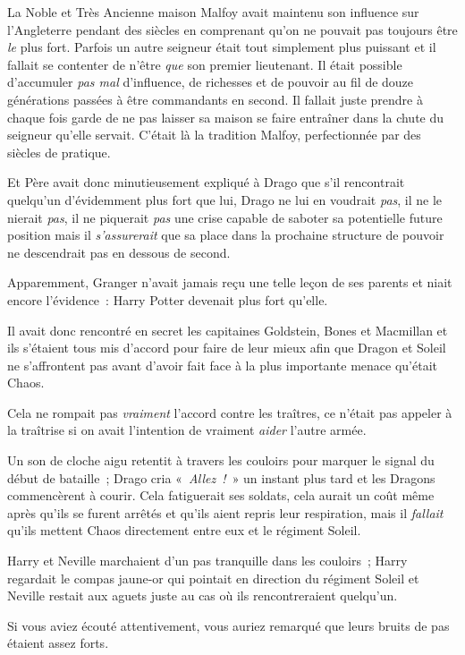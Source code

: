 La Noble et Très Ancienne maison Malfoy avait maintenu son influence sur l'Angleterre pendant des siècles en comprenant qu'on ne pouvait pas toujours être \emph{le} plus fort. Parfois un autre seigneur était tout simplement plus puissant et il fallait se contenter de n'être \emph{que} son premier lieutenant. Il était possible d'accumuler \emph{pas mal} d'influence, de richesses et de pouvoir au fil de douze générations passées à être commandants en second. Il fallait juste prendre à chaque fois garde de ne pas laisser sa maison se faire entraîner dans la chute du seigneur qu'elle servait. C'était là la tradition Malfoy, perfectionnée par des siècles de pratique.

Et Père avait donc minutieusement expliqué à Drago que s'il rencontrait quelqu'un d'évidemment plus fort que lui, Drago ne lui en voudrait \emph{pas}, il ne le nierait \emph{pas}, il ne piquerait \emph{pas} une crise capable de saboter sa potentielle future position mais il \emph{s'assurerait} que sa place dans la prochaine structure de pouvoir ne descendrait pas en dessous de second.

Apparemment, Granger n'avait jamais reçu une telle leçon de ses parents et niait encore l'évidence~: Harry Potter devenait plus fort qu'elle.

Il avait donc rencontré en secret les capitaines Goldstein, Bones et Macmillan et ils s'étaient tous mis d'accord pour faire de leur mieux afin que Dragon et Soleil ne s'affrontent pas avant d'avoir fait face à la plus importante menace qu'était Chaos.

Cela ne rompait pas \emph{vraiment} l'accord contre les traîtres, ce n'était pas appeler à la traîtrise si on avait l'intention de vraiment \emph{aider} l'autre armée.

Un son de cloche aigu retentit à travers les couloirs pour marquer le signal du début de bataille~; Drago cria «~\emph{Allez~!}~» un instant plus tard et les Dragons commencèrent à courir. Cela fatiguerait ses soldats, cela aurait un coût même après qu'ils se furent arrêtés et qu'ils aient repris leur respiration, mais il \emph{fallait} qu'ils mettent Chaos directement entre eux et le régiment Soleil.

\later

Harry et Neville marchaient d'un pas tranquille dans les couloirs~; Harry regardait le compas jaune-or qui pointait en direction du régiment Soleil et Neville restait aux aguets juste au cas où ils rencontreraient quelqu'un.

Si vous aviez écouté attentivement, vous auriez remarqué que leurs bruits de pas étaient assez forts.

